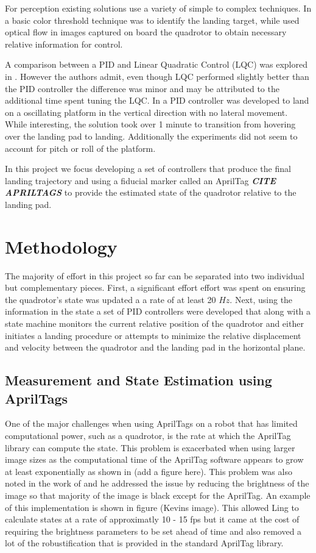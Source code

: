 \documentclass[11pt, twocolumn]{article}
\begin{document}
For perception existing solutions use a variety of simple to complex techniques. In \cite{Kim2014} a basic color threshold technique was to identify the landing target, while \cite{Herisse2012} used optical flow in images captured on board the quadrotor to obtain necessary relative information for control. 

A comparison between a PID and Linear Quadratic Control (LQC) was explored in \cite{Friis2009}. However the authors admit, even though LQC performed slightly better than the PID controller the difference was minor and may be attributed to the additional time spent tuning the LQC. In \cite{Herisse2012} a PID controller was developed to land on a oscillating platform in the vertical direction with no lateral movement. While interesting, the solution took over 1 minute to transition from hovering over the landing pad to landing. Additionally the experiments did not seem to account for pitch or roll of the platform.  


In this project we focus developing a set of controllers that produce the final landing trajectory and using a fiducial marker called an AprilTag \textbf{\textit{CITE APRILTAGS}} to provide the estimated state of the quadrotor relative to the landing pad. 

\section{Methodology}
The majority of effort in this project so far can be separated into two individual but complementary pieces. First, a significant effort effort was spent on ensuring the quadrotor's state was updated a a rate of at least 20 $Hz$. Next, using the information in the state  a set of PID controllers were developed that along with a state machine monitors the current relative position of the quadrotor and either initiates a landing procedure or attempts to minimize the relative displacement and velocity between the quadrotor and the landing pad in the horizontal plane. 

\subsection{Measurement and State Estimation using AprilTags}
One of the major challenges when using AprilTags on a robot that has limited computational power, such as a quadrotor, is the rate at which the AprilTag library can compute the state. This problem is exacerbated when using larger image sizes as the computational time of the AprilTag software appears to grow at least exponentially as shown in (add a figure here). This problem was also noted in the work of \cite{Ling2014} and he addressed the issue by reducing the brightness of the image so that majority of the image is black except for the AprilTag. An example of this implementation is shown in figure (Kevins image). This allowed Ling \cite{Lee2012} to calculate states at a rate of approximatly 10 - 15 fps but it came at the cost of requiring the brightness parameters to be set ahead of time and also removed a lot of the robustification that is provided in the standard AprilTag library.
\end{document}
